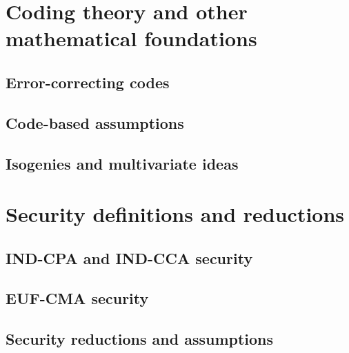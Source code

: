 \chapter{Coding theory and other mathematical foundations}
\section{Error-correcting codes}
\section{Code-based assumptions}
\section{Isogenies and multivariate ideas}

\chapter{Security definitions and reductions}
\section{IND-CPA and IND-CCA security}
\section{EUF-CMA security}
\section{Security reductions and assumptions}
